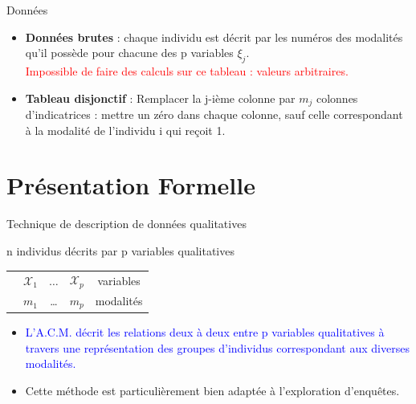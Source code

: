 \documentclass[12pt]{beamer}
\begin{document}
\begin{frame}{ Données}
 
 \begin{itemize}
 \item \textbf{Données brutes} :  chaque individu est décrit par les numéros
des modalités qu’il possède pour chacune des p variables $\xi_j$.\\

\textcolor{red}{Impossible de faire des calculs sur ce tableau :  valeurs arbitraires.}

 \item  \textbf{Tableau disjonctif } : Remplacer la j-ième colonne par $m_j$ colonnes d'indicatrices : mettre  un zéro dans chaque colonne, sauf celle correspondant à la modalité de l’individu i qui
reçoit 1.
 \end{itemize}

 


\end{frame}







\section{Présentation Formelle}

\begin{frame}{Technique de description de données qualitatives}

n individus décrits par p variables qualitatives\\

\begin{table}
\begin{tabular}{ccccc}

 & $\mathcal{X}_1$& $\ldots$ & $ \mathcal{X}_p$& variables \\
 & $m_1$ & \ldots  &$m_p$ & modalités 
 
\end{tabular} 
\end{table}

\begin{itemize}
\item \textcolor{blue}{L'A.C.M. décrit les relations deux à deux entre p variables qualitatives à travers une représentation des groupes d'individus correspondant aux diverses modalités.} \\

\item Cette méthode est particulièrement bien adaptée à l'exploration d'enquêtes.
\end{itemize}

\end{frame}
\end{document}
